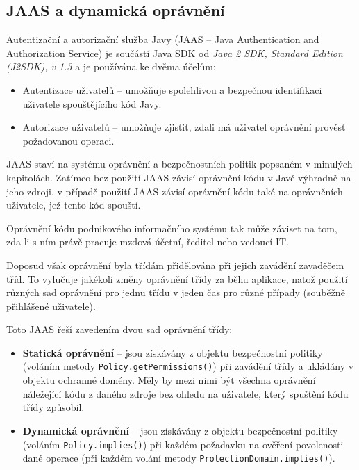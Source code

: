\subsection{JAAS a dynamická oprávnění}\label{nestatickaOpravneni}

Autentizační a autorizační služba Javy (JAAS -- Java Authentication and Authorization Service) je součástí Java SDK od {\it Java 2 SDK, Standard Edition (J2SDK), v 1.3} a je používána ke dvěma účelům: \cite{jaasReference}

\begin{itemize}
  \item Autentizace uživatelů -- umožňuje spolehlivou a bezpečnou identifikaci uživatele spouštějícího kód Javy. \cite{jaasReference}
  \item Autorizace uživatelů -- umožňuje zjistit, zdali má uživatel oprávnění provést požadovanou operaci. \cite{jaasReference}
\end{itemize}

JAAS staví na systému oprávnění a bezpečnostních politik popsaném v minulých kapitolách. Zatímco bez použití JAAS závisí oprávnění kódu v Javě výhradně na jeho zdroji, v případě použití JAAS závisí oprávnění kódu také na oprávněních uživatele, jež tento kód spouští.

Oprávnění kódu podnikového informačního systému tak může záviset na tom, zda-li s ním právě pracuje mzdová účetní, ředitel nebo vedoucí IT.

Doposud však oprávnění byla třídám přidělována při jejich zavádění zavaděčem tříd. To vylučuje jakékoli změny oprávnění třídy za běhu aplikace, natož použití různých sad oprávnění pro jednu třídu v jeden čas pro různé případy (souběžně přihlášené uživatele).

Toto JAAS řeší zavedením dvou sad oprávnění třídy:

\begin{itemize}
  \item {\bf Statická oprávnění} -- jsou získávány z objektu bezpečnostní politiky (voláním metody {\tt Policy.getPermissions()}) při zavádění třídy a ukládány v objektu ochranné domény. Měly by mezi nimi být všechna oprávnění náležející kódu z daného zdroje bez ohledu na uživatele, který spuštění kódu třídy způsobil.
  \item {\bf Dynamická oprávnění} -- jsou získávány z objektu bezpečnostní politiky (voláním {\tt Policy.implies()}) při každém požadavku na ověření povolenosti dané operace (při každém volání metody {\tt ProtectionDomain.implies()}).
\end{itemize}


